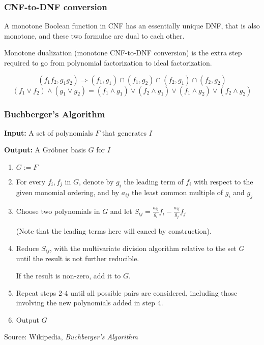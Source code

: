 \documentclass[11pt]{beamer}
\begin{document}
\begin{frame}
\frametitle{CNF-to-DNF conversion}

\begin{definition}
A monotone Boolean function in CNF has an essentially unique DNF, that is also monotone,
and these two formulae are dual to each other.
\end{definition}

\vskip 12pt

Monotone dualization (monotone CNF-to-DNF conversion) is the extra step required to go from polynomial factorization to ideal factorization.

\[
(f_1 f_2, g_1 g_2) \Rightarrow (f_1, g_1) \cap (f_1, g_2) \cap (f_2, g_1) \cap (f_2, g_2)
\]
\[
(f_1 \vee f_2) \wedge (g_1 \vee g_2) = (f_1 \wedge g_1) \vee (f_2 \wedge g_1) \vee (f_1 \wedge g_2) \vee (f_2 \wedge g_2)
\]
\end{frame}

\begin{frame}
\frametitle{Buchberger's Algorithm}

{\bf Input:} A set of polynomials $F$ that generates $I$

{\bf Output:} A Gröbner basis $G$ for $I$

\begin{enumerate}
\item $G := F$
\item For every $f_i,f_j$ in $G$, denote by $g_i$ the leading term of $f_i$ with respect to the given monomial ordering,
and by $a_{ij}$ the least common multiple of $g_i$ and $g_j$
\item Choose two polynomials in $G$ and let $S_{ij}=\frac{a_{ij}}{g_i}f_i  - \frac{a_{ij}}{g_j}f_j $

(Note that the leading terms here will cancel by construction).
\item Reduce $S_{ij}$, with the multivariate division algorithm relative to the set $G$ until the result is not further reducible.

If the result is non-zero, add it to $G$.
\item Repeat steps 2-4 until all possible pairs are considered, including those involving the new polynomials added in step 4.
\item Output $G$
\end{enumerate}

Source: Wikipedia, {\it Buchberger's Algorithm}
\end{frame}
\end{document}

